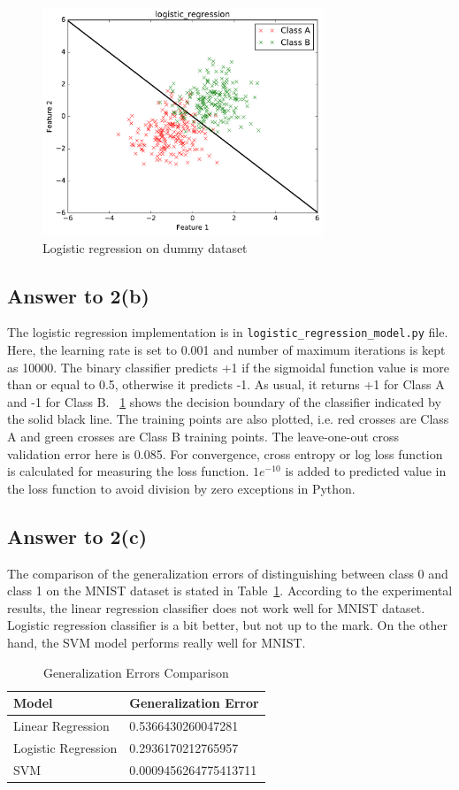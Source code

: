 \documentclass[runningheads]{llncs}
\begin{document}
\begin{figure}
\centering
\includegraphics[width=0.75\textwidth]{logistic_regression.pdf}
\caption{Logistic regression on dummy dataset} \label{fig:logistic_dummy}
\end{figure}
\subsection{Answer to 2(b)}
The logistic regression implementation is in \texttt{logistic\_regression\_model.py} file. Here, the learning rate is
set to 0.001 and number of maximum iterations is kept as 10000. The binary classifier predicts +1 if the
sigmoidal function value is more than or equal to 0.5, otherwise it predicts -1.
As usual, it returns +1 for Class A and -1 for Class B. \figurename~\ref{fig:logistic_dummy} shows the decision boundary
of the classifier indicated by the solid black line. The training points are also plotted, i.e. red crosses are
Class A and green crosses are Class B training points. The leave-one-out cross validation error here is 0.085.
For convergence, cross entropy or log loss function is calculated for measuring the loss function. $1e^{-10}$ is
added to predicted value in the loss function to avoid division by zero exceptions in Python.

\subsection{Answer to 2(c)}
The comparison of the generalization errors of distinguishing between class 0 and class 1 on the MNIST
dataset is stated in Table~\ref{tab:comp}. According to the experimental results, the linear regression
classifier does not work well for MNIST dataset. Logistic regression classifier is a bit better, but not
up to the mark. On the other hand, the SVM model performs really well for MNIST.
\begin{table}
\centering
\caption{Generalization Errors Comparison}\label{tab:comp}
\begin{tabular}{|l|l|}
\hline
Model &  Generalization Error\\
\hline
Linear Regression & 0.5366430260047281\\
Logistic Regression & 0.2936170212765957\\
SVM & 0.0009456264775413711\\
\hline
\end{tabular}
\end{table}
\end{document}
